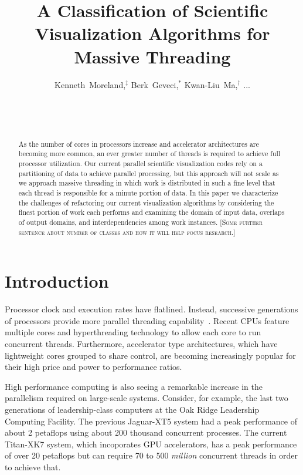 \documentclass{sig-alternate}
\title{A Classification of Scientific Visualization Algorithms for Massive Threading}
\author{
  \alignauthor
  Kenneth~Moreland,$^{\ddagger}$ Berk~Geveci,$^*$ Kwan-Liu~Ma,$^{\dagger}$ ...\\
  \affaddr{$^{\ddagger}$Sandia National Laboratories}\\
  \affaddr{$^*$Kitware, Inc.}\\
  \affaddr{$^{\dagger}$University of California at Davis}\\
}
\newcommand*{\lcite}[1]{~\cite{#1}}
\newcommand{\fix}[1]{{\color{red}\textsc{[#1]}}}
\begin{document}
\maketitle

\begin{abstract}

As the number of cores in processors increase and accelerator architectures
are becoming more common, an ever greater number of threads is required to
achieve full processor utilization. Our current parallel scientific
visualization codes rely on a partitioning of data to achieve parallel
processing, but this approach will not scale as we approach massive
threading in which work is distributed in such a fine level that each
thread is responsible for a minute portion of data. In this paper we
characterize the challenges of refactoring our current visualization
algorithms by considering the finest portion of work each performs and
examining the domain of input data, overlaps of output domains, and
interdependencies among work instances. \fix{Some further sentence about
  number of classes and how it will help focus research.}

\end{abstract}

\section{Introduction}

\noindent
Processor clock and execution rates have flatlined. Instead, successive
generations of processors provide more parallel threading
capability\lcite{Sutter2005}. Recent CPUs feature multiple cores and
hyperthreading technology to allow each core to run concurrent
threads. Furthermore, accelerator type architectures, which have
lightweight cores grouped to share control, are becoming increasingly
popular for their high price and power to performance ratios.

High performance computing is also seeing a remarkable increase in the
parallelism required on large-scale systems. Consider, for example, the
last two generations of leadership-class computers at the Oak Ridge
Leadership Computing Facility. The previous Jaguar-XT5 system had a peak
performance of about 2 petaflops using about 200 thousand concurrent
processes. The current Titan-XK7 system, which incoporates GPU
accelerators, has a peak performance of over 20 petaflops but can require
70 to 500 \emph{million} concurrent threads in order to achieve that.
\end{document}
